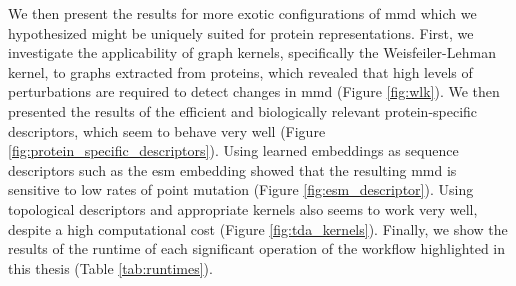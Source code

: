 We then present the results for more exotic configurations of \acrshort{mmd} which we
hypothesized might be uniquely suited for protein representations. First, we
investigate the applicability of graph kernels, specifically the
Weisfeiler-Lehman kernel, to graphs extracted from proteins, which revealed that
high levels of perturbations are required to detect changes in \acrshort{mmd} (Figure
\ref{fig:wlk}). We then presented the results of the efficient and biologically
relevant protein-specific descriptors, which seem to behave very well (Figure
\ref{fig:protein_specific_descriptors}). Using learned embeddings as sequence
descriptors such as the \acrshort{esm} embedding showed that the resulting \acrshort{mmd} is sensitive
to low rates of point mutation (Figure \ref{fig:esm_descriptor}). Using
topological descriptors and appropriate kernels also seems to work very well, despite
a high computational cost (Figure \ref{fig:tda_kernels}). Finally, we show the
results of the runtime of each significant operation of the workflow highlighted
in this thesis (Table \ref{tab:runtimes}).
